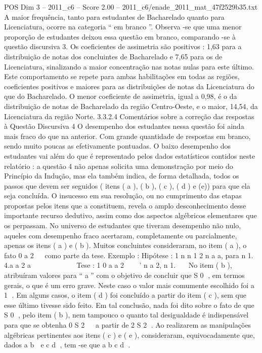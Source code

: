 \begin{textsample}{POS Dim 3 – 2011\_c6 – Score 2.00 – 2011\_c6/enade\_2011\_mat\_47f2529b35.txt}
A maior frequência, tanto para estudantes de Bacharelado quanto para Licenciatura, ocorre na categoria “ em branco ”.
Observa -se que uma menor proporção de estudantes deixou essa questão em branco, comparando -se à questão discursiva 3.
Os coeficientes de assimetria são positivos : 1,63 para a distribuição de notas dos concluintes de Bacharelado e 7,65 para os de Licenciatura, sinalizando a maior concentração nas notas nulas para este último.
Este comportamento se repete para ambas habilitações em todas as regiões, coeficientes positivos e maiores para as distribuições de notas da Licenciatura do que do Bacharelado.
O menor coeficiente de assimetria, igual a 0,98, é o da distribuição de notas de Bacharelado da região Centro-Oeste, e o maior, 14,54, da Licenciatura da região Norte. 3.3.2.4 Comentários sobre a correção das respostas à Questão Discursiva 4 O desempenho dos estudantes nessa questão foi ainda mais fraco do que na anterior.
Com grande quantidade de respostas em branco, sendo muito poucas as efetivamente pontuadas.
O baixo desempenho dos estudantes vai além do que é representado pelos dados estatísticos contidos neste relatório : a questão 4 não apenas solicita uma demonstração por meio do Princípio da Indução, mas ela também indica, de forma detalhada, todos os passos que devem ser seguidos ( itens ( a ), ( b ), ( c ), ( d ) e (e)) para que ela seja concluída.
O insucesso em sua resolução, ou no cumprimento das etapas propostas pelos itens que a constituem, revela o amplo desconhecimento desse importante recurso dedutivo, assim como dos aspectos algébricos elementares que os perpassam.
No universo de estudantes que tiveram desempenho não nulo, aqueles com desempenho fraco acertaram, completamente ou parcialmente, apenas os itens ( a ) e ( b ).
Muitos concluintes consideraram, no item ( a ), o fato 0 a 2   como parte da tese.
Exemplo : Hipótese : 1 n n 1 2 n a a, para n 1. 4.a a 2 a           Tese : 1 0 a a 2    ' n a 2, n 1.   No item ( b ), atribuíram valores para “ a ” com o objetivo de concluir que S 0 , em termos gerais, o que é um erro grave.
Neste caso o valor mais comumente escolhido foi a 1 .
Em alguns casos, o item ( d ) foi concluído a partir do item ( c ), sem que esse último tivesse sido feito.
Em tal conclusão, nada foi dito sobre o fato de que S 0 , pelo item ( b ), nem tampouco o quanto tal desigualdade é indispensável para que se obtenha 0 S 2   a partir de 2 S 2 .
Ao realizarem as manipulações algébricas pertinentes aos itens ( c ) e ( e ), consideraram, equivocadamente que, dados a b  e c d , tem -se que a b c d .

\end{textsample}
